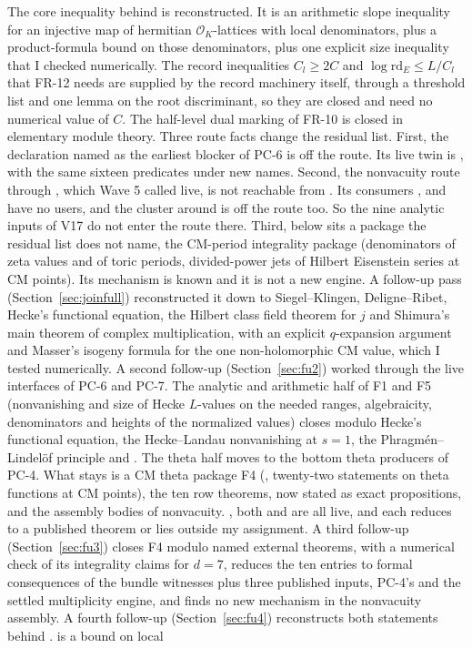 \documentclass[11pt]{article}
\newcommand{\FR}[1]{\textsf{FR-#1}}
\newcommand{\PC}[1]{\textsf{PC-#1}}
\theoremstyle{remark}
\begin{document}
The core inequality behind  is reconstructed. It is an arithmetic slope inequality for an injective map of hermitian $\mathcal O_K$-lattices with local denominators, plus a product-formula bound on those denominators, plus one explicit size inequality that I checked numerically. The record inequalities $C_l\ge 2C$ and $\log\mathrm{rd}_E\le L/C_l$ that \FR{12} needs are supplied by the record machinery itself, through a threshold list and one lemma on the root discriminant, so they are closed and need no numerical value of $C$. The half-level dual marking of \FR{10} is closed in elementary module theory. Three route facts change the residual list. First, the declaration  named as the earliest blocker of \PC{6} is off the route. Its live twin is , with the same sixteen predicates under new names. Second, the nonvacuity route through , which Wave 5 called live, is not reachable from . Its consumers ,  and  have no users, and the cluster around  is off the route too. So the nine analytic inputs of V17 do not enter the route there. Third, below  sits a package the residual list does not name, the CM-period integrality package  (denominators of zeta values and of toric periods, divided-power jets of Hilbert Eisenstein series at CM points). Its mechanism is known and it is not a new engine. A follow-up pass (Section~\ref{sec:joinfull}) reconstructed it down to Siegel--Klingen, Deligne--Ribet, Hecke's functional equation, the Hilbert class field theorem for $j$ and Shimura's main theorem of complex multiplication, with an explicit $q$-expansion argument and Masser's isogeny formula for the one non-holomorphic CM value, which I tested numerically. A second follow-up (Section~\ref{sec:fu2}) worked through the live interfaces of \PC{6} and \PC{7}. The analytic and arithmetic half of F1 and F5 (nonvanishing and size of Hecke $L$-values on the needed ranges, algebraicity, denominators and heights of the normalized values) closes modulo Hecke's functional equation, the Hecke--Landau nonvanishing at $s=1$, the Phragm\'en--Lindel\"of principle and . The theta half moves to the bottom theta producers of \PC{4}. What stays is a CM theta package F4 (, twenty-two statements on theta functions at CM points), the ten  row theorems, now stated as exact propositions, and the assembly bodies of nonvacuity. , both  and  are all live, and each reduces to a published theorem or lies outside my assignment. A third follow-up (Section~\ref{sec:fu3}) closes F4 modulo named external theorems, with a numerical check of its integrality claims for $d=7$, reduces the ten  entries to formal consequences of the bundle witnesses plus three published inputs, \PC{4}'s  and the settled multiplicity engine, and finds no new mechanism in the nonvacuity assembly. A fourth follow-up (Section~\ref{sec:fu4}) reconstructs both statements behind .  is a bound on local 
\end{document}
